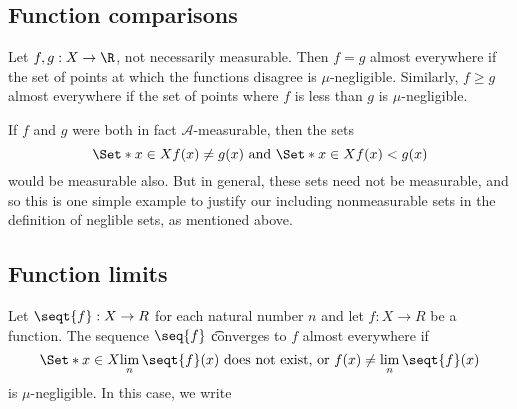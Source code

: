 \subsection*{Function comparisons}

Let $f, g: X \to \R $, not necessarily measurable.
Then $f = g$ almost everywhere if the set of points at which the functions disagree is
$\mu $-negligible.
Similarly, $f \geq g$ almost everywhere if the set of points where $f$ is less than $g$ is $\mu $-negligible.

If $f$ and $g$ were both in fact $\mathcal{A} $-measurable, then the sets
    \[
\Set*{x \in X}{f(x) \neq g(x)}
\text{ and }
\Set*{x \in X}{f(x) < g(x)}
    \]
would be measurable also.
But in general, these sets need not be measurable, and so this is one simple example to justify our including nonmeasurable sets in the definition of neglible sets, as mentioned above.

\subsection*{Function limits}

Let $\seqt{f}: X \to R$ for each natural number $n$ and let $f: X \to R$ be a function.
The sequence $\seq{f}$ \t{converges to $f$ almost everywhere} if
    \[
\Set*{x \in X}{\lim_{n} \seqt{f}(x) \text{ does not exist, or } f(x) \neq \lim_{n} \seqt{f}(x)}
    \]
is $\mu $-negligible.
In this case, we write 
